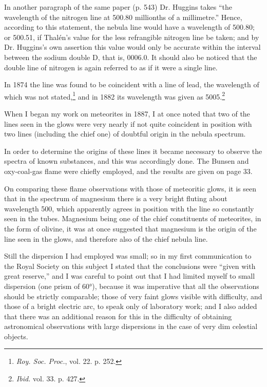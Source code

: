 \documentclass[a4paper, 12pt, oneside, polutonikogreek, english]{article}
\begin{document}
In another paragraph of the same paper (p. 543) Dr. Huggins takes ``the wavelength of the nitrogen line at 500.80 millionths of a millimetre.'' Hence, according to this statement, the nebula line would have a wavelength of 500.80; or 500.51, if Thalén's value for the less refrangible nitrogen line be taken; and by Dr. Huggins's own assertion this value would only be accurate within the interval between the sodium double D, that is, 0006.0. It should also be noticed that the double line of nitrogen is again referred to as if it were a single line.

In 1874 the line was found to be coincident with a line of lead, the wavelength of which was not stated,\footnote{\emph{Roy. Soc. Proc.}, vol. 22. p. 252.} and in 1882 its wavelength was given as 5005.\footnote{\emph{Ibid.} vol. 33. p. 427.}

When I began my work on meteorites in 1887, I at once noted that two of the lines seen in the glows were very nearly if not quite coincident in position with two lines (including the chief one) of doubtful origin in the nebula spectrum.

In order to determine the origins of these lines it became necessary to observe the spectra of known substances, and this was accordingly done. The Bunsen and oxy-coal-gas flame were chiefly employed, and the results are given on page 33.

On comparing these flame observations with those of meteoritic glows, it is seen that in the spectrum of magnesium there is a very bright fluting about wavelength 500, which apparently agrees in position with the line so constantly seen in the tubes. Magnesium being one of the chief constituents of meteorites, in the form of olivine, it was at once suggested that magnesium is the origin of the line seen in the glows, and therefore also of the chief nebula line.

Still the dispersion I had employed was small; so in my first communication to the Royal Society on this subject I stated that the conclusions were ``given with great reserve,'' and I was careful to point out that I had limited myself to small dispersion (one prism of 60°), because it was imperative that all the observations should be strictly comparable; those of very faint glows visible with difficulty, and those of a bright electric arc, to speak only of laboratory work; and I also added that there was an additional reason for this in the difficulty of obtaining astronomical observations with large dispersions in the case of very dim celestial objects.
\end{document}
